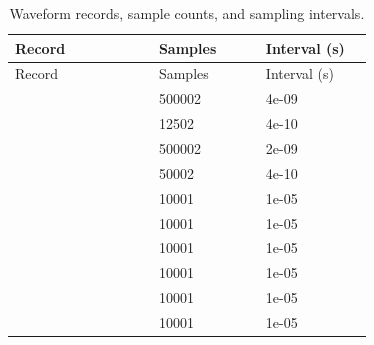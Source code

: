 \begingroup
\scriptsize
\setlength{\tabcolsep}{3pt}
\renewcommand{\arraystretch}{1.12}
\begin{longtable}{@{}L{0.3562\linewidth} L{0.2619\linewidth} L{0.2619\linewidth}@{}}
\caption{Waveform records, sample counts, and sampling intervals.}\label{tab:raw-waveform-sources}\\
\toprule
Record & Samples & Interval (s)\\
\midrule
\endfirsthead
\toprule
Record & Samples & Interval (s)\\
\midrule
\endhead
{} & 500002 & 4e-09\\
 & 12502 & 4e-10\\
 & 500002 & 2e-09\\
 & 50002 & 4e-10\\
 & 10001 & 1e-05\\
 & 10001 & 1e-05\\
 & 10001 & 1e-05\\
 & 10001 & 1e-05\\
 & 10001 & 1e-05\\
 & 10001 & 1e-05\\
\bottomrule
\end{longtable}
\endgroup
